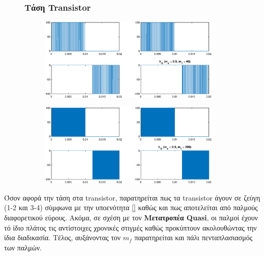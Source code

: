 \begin{figure}[h!]
	\subsubsection*{Τάση Transistor}
		\begin{subfigure}{0.49\textwidth}
		\centering
		\includegraphics[width=0.95\textwidth]{Images/V_Q_40}
	\end{subfigure}
	\begin{subfigure}{0.49\textwidth}
		\centering
		\includegraphics[width=0.95\textwidth]{Images/V_Q_200}
	\end{subfigure}
\end{figure}
\noindent
Όσον αφορά την τάση στα transistor, παρατηρείται πως τα transistor άγουν σε ζεύγη (1-2 και 3-4) σύμφωνα με την υποενότητα \ref{} καθώς και πως αποτελείται από παλμούς διαφορετικού εύρους.  Ακόμα, σε σχέση με τον \textbf{Μετατροπέα Quasi}, οι παλμοί έχουν τό ίδιο πλάτος τις αντίστοιχες χρονικές στιγμές καθώς προκύπτουν ακολουθώντας την ίδια διαδικασία. Τέλος, αυξάνοντας τον $m_f$ παρατηρείται και πάλι πενταπλασιασμός των παλμών.\\
